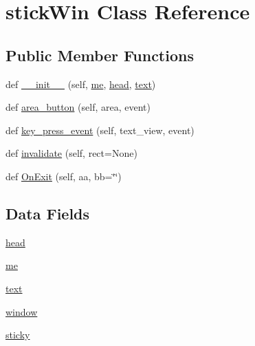 \hypertarget{classyellow_1_1stick_win}{}\section{stick\+Win Class Reference}
\label{classyellow_1_1stick_win}
\subsection*{Public Member Functions}
\begin{DoxyCompactItemize}
\item 
def \hyperlink{classyellow_1_1stick_win_aa16d52e08a19e19e0a6aeb32c7702840}{\+\_\+\+\_\+init\+\_\+\+\_\+} (self, \hyperlink{classyellow_1_1stick_win_a9c2f924fb2f7004e7979ab2027ca1d65}{me}, \hyperlink{classyellow_1_1stick_win_a434acd167ada209c34621739b6b8c583}{head}, \hyperlink{classyellow_1_1stick_win_af575f17e6be3f269b86b041a60560dbf}{text})
\item 
def \hyperlink{classyellow_1_1stick_win_a260d37924dae7e20867bbd197b9044ee}{area\+\_\+button} (self, area, event)
\item 
def \hyperlink{classyellow_1_1stick_win_aa33fa2b192b46f3d8e5e17d53a463f3c}{key\+\_\+press\+\_\+event} (self, text\+\_\+view, event)
\item 
def \hyperlink{classyellow_1_1stick_win_a038ffcc265f4f83c2fbb952297dce8d7}{invalidate} (self, rect=None)
\item 
def \hyperlink{classyellow_1_1stick_win_a78b79da4bf62826f29316cd206c79241}{On\+Exit} (self, aa, bb=\char`\"{}\char`\"{})
\end{DoxyCompactItemize}
\subsection*{Data Fields}
\begin{DoxyCompactItemize}
\item 
\hyperlink{classyellow_1_1stick_win_a434acd167ada209c34621739b6b8c583}{head}
\item 
\hyperlink{classyellow_1_1stick_win_a9c2f924fb2f7004e7979ab2027ca1d65}{me}
\item 
\hyperlink{classyellow_1_1stick_win_af575f17e6be3f269b86b041a60560dbf}{text}
\item 
\hyperlink{classyellow_1_1stick_win_a04a8a2bbfa9c15500892b8e5033d625b}{window}
\item 
\hyperlink{classyellow_1_1stick_win_a56bf4260587baa1f272837175342b62a}{sticky}
\end{DoxyCompactItemize}


